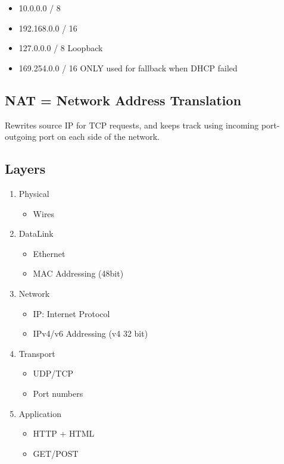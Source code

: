 \documentclass[10pt, a4paper, leqno]{article}
\providecommand{\tightlist}{%
  \setlength{\itemsep}{0pt}\setlength{\parskip}{0pt}}
\begin{document}
\begin{multicols}{2}
\begin{itemize}
\tightlist
\item 10.0.0.0 / 8
\item 192.168.0.0 / 16
\item 127.0.0.0 / 8 Loopback
\item 169.254.0.0 / 16 ONLY used for fallback when DHCP failed
\end{itemize}

\subsection {NAT = Network Address Translation}

Rewrites source IP for TCP requests, and keeps track using incoming port-outgoing port on each side of the network. 

\subsection {Layers}

\begin{enumerate}
\tightlist
\item Physical
    \begin{itemize}
    \tightlist
        \item Wires
    \end{itemize}
\item DataLink
    \begin{itemize}
    \tightlist
        \item Ethernet
        \item MAC Addressing (48bit)
    \end{itemize}
\item Network
    \begin{itemize}
    \tightlist
        \item IP: Internet Protocol
        \item IPv4/v6 Addressing (v4 32 bit)
    \end{itemize}
\item Transport
    \begin{itemize}
    \tightlist
        \item UDP/TCP
        \item Port numbers
    \end{itemize}
\item Application
    \begin{itemize}
    \tightlist
        \item HTTP + HTML
        \item GET/POST
    \end{itemize}
\end{enumerate}



\end{multicols}
\end{document}
